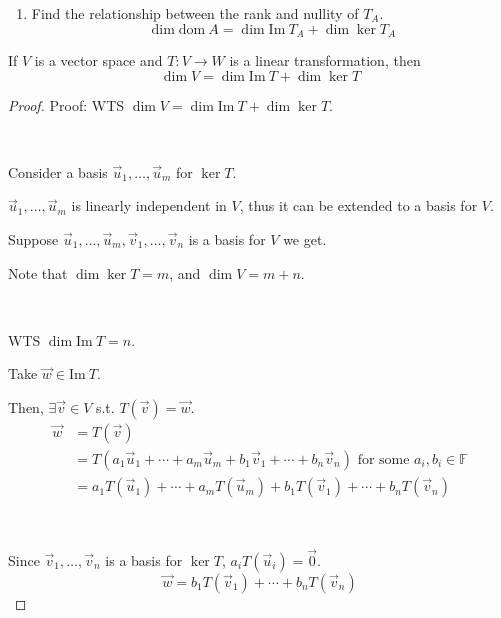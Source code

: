 \documentclass[11pt,fleqn]{book} %
\begin{document}
\begin{example}
\begin{enumerate}
        \item Find the relationship between the rank and nullity of $T_A$. 
        $$\dim \mathrm{dom}~A = \dim \mathrm{Im}~T_A + \dim \ker  T_A $$
    \end{enumerate}
\end{example}

\setcounter{section}{3}
\setcounter{dummy}{16}
\begin{theorem}
    If $V$ is a  vector space and $T: V \to W$ is a linear transformation, then $$\dim V = \dim \mathrm{Im}~T + \dim \ker T$$
\end{theorem}
\setcounter{section}{2}

\begin{proof}
    Proof: WTS $\dim V = \dim \mathrm{Im}~T + \dim \ker T$. 

    {~~~}
    
    Consider a basis $\vec{u}_1, \dots, \vec{u}_m$ for $\ker T$. 
    
    $\vec{u}_1, \dots, \vec{u}_m$ is linearly independent in $V$, thus it can be extended to a basis for $V$. 
    
    Suppose $\vec{u}_1, \dots, \vec{u}_m, \vec{v}_1, \dots, \vec{v}_n$ is a basis for $V$ we get. 

    Note that $\dim \ker T = m$, and $\dim V = m + n$. 
    
    {~~~}

    WTS $\dim \mathrm{Im}~T = n$. 
    
    Take $\vec{w} \in \mathrm{Im}~T$. 
    
    Then, $\exists \vec{v} \in V$ s.t. $T(\vec{v}) = \vec{w}$. 
    \begin{align*}  
        \vec{w}
        &=T(\vec{v})
        \\
        &= T(a_1\vec{u}_1 + \cdots + a_m\vec{u}_m + b_1\vec{v}_1 + \cdots + b_n\vec{v}_n)
        \text{ for some }a_i, b_i \in \mathbb{F}
        \\
        &= a_1T(\vec{u}_1) + \cdots + a_mT(\vec{u}_m) + b_1T(\vec{v}_1) + \cdots + b_nT(\vec{v}_n)
    \end{align*}
    
    {~~~}

    Since $\vec{v}_1, \dots, \vec{v}_n$ is a basis for $\ker T$, $a_iT(\vec{u}_i) = \vec{0}$. 
    $$\vec{w} = b_1T(\vec{v}_1) + \cdots + b_nT(\vec{v}_n)$$


\end{proof}
\end{document}
